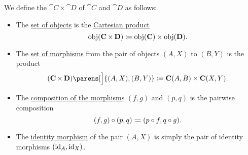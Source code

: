 \begin{definition}\label{def:product_category}
  We define the  \( \cat{C} \times \cat{D} \) of \( \cat{C} \) and \( \cat{D} \) as follows:

  \begin{itemize}
    \item The \hyperref[def:category/objects]{set of objects} is the \hyperref[def:cartesian_product]{Cartesian product}
    \begin{equation}\label{eq:def:product_category/objects}
      \operatorname{obj}(\operatorname{\mathbf{C}} \times \operatorname{\mathbf{D}}) \coloneqq \operatorname{obj}(\operatorname{\mathbf{C}}) \times \operatorname{obj}(\operatorname{\mathbf{D}}).
    \end{equation}

    \item The \hyperref[def:category/morphisms]{set of morphisms} from the pair of objects \( (A, X) \) to \( (B, Y) \) is the product
    \begin{equation}\label{eq:def:product_category/morphisms}
      (\cat{C} \times \cat{D})\parens[\Big]{ (A, X), (B, Y) } \coloneqq \cat{C}(A, B) \times \cat{C}(X, Y).
    \end{equation}

    \item The \hyperref[def:category/composition]{composition of the morphisms} \( (f, g) \) and \( (p, q) \) is the pairwise composition
    \begin{equation}\label{eq:def:product_category/composition}
      (f, g) \bincirc (p, q) \coloneqq (p \bincirc f, q \bincirc g).
    \end{equation}

    \item The \hyperref[def:category/identity]{identity morphism} of the pair \( (A, X) \) is simply the pair of identity morphisms \( (\operatorname{id}_A, \operatorname{id}_X) \).
  \end{itemize}
\end{definition}

